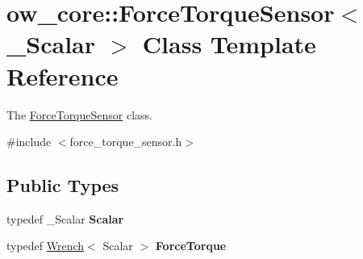 \hypertarget{classow__core_1_1ForceTorqueSensor}{}\section{ow\+\_\+core\+:\+:Force\+Torque\+Sensor$<$ \+\_\+\+Scalar $>$ Class Template Reference}
\label{classow__core_1_1ForceTorqueSensor}


The \hyperlink{classow__core_1_1ForceTorqueSensor}{Force\+Torque\+Sensor} class.  




{\ttfamily \#include $<$force\+\_\+torque\+\_\+sensor.\+h$>$}

\subsection*{Public Types}
\begin{DoxyCompactItemize}
\item 
typedef \+\_\+\+Scalar {\bfseries Scalar}\hypertarget{classow__core_1_1ForceTorqueSensor_a73bbb49785c152e6139b10f332ac851a}{}\label{classow__core_1_1ForceTorqueSensor_a73bbb49785c152e6139b10f332ac851a}

\item 
typedef \hyperlink{classow__core_1_1Wrench}{Wrench}$<$ Scalar $>$ {\bfseries Force\+Torque}\hypertarget{classow__core_1_1ForceTorqueSensor_ad4979dd6826eeba48f5cc706dee63c51}{}\label{classow__core_1_1ForceTorqueSensor_ad4979dd6826eeba48f5cc706dee63c51}

\end{DoxyCompactItemize}
